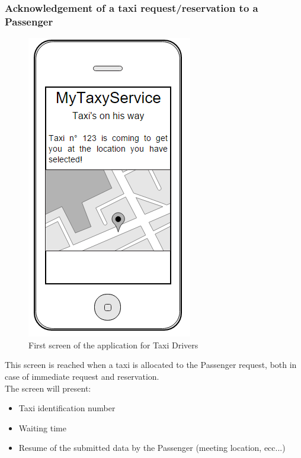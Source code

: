 \subsubsection{Acknowledgement of a taxi request/reservation to a Passenger}
\begin{figure}[H]
\centering
\includegraphics[scale=0.6]{Images/taxi_coming}
\caption{First screen of the application for Taxi Drivers}
\end{figure}
This screen is reached when a taxi is allocated to the Passenger request, both in case of immediate request and reservation.\\
The screen will present:
\begin{itemize}
\item Taxi identification number
\item Waiting time
\item Resume of the submitted data by the Passenger (meeting location, ecc...)
\end{itemize}

